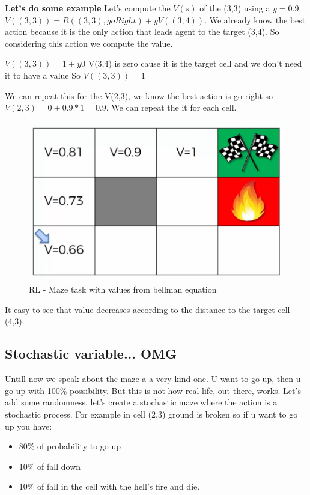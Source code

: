 \textbf{Let's do some example}
Let's compute the $V(s)$ of the (3,3) using a $y = 0.9$.
$V((3,3)) = R((3,3), goRight) + yV((3,4))$. We already know the best action because it is the only action that leads agent to the target (3,4). So considering this action we compute the value.

$V((3,3)) = 1 + y0$ V(3,4) is zero cause it is the target cell and we don't need it to have a value
So $V((3,3)) = 1$

We can repeat this for the V(2,3), we know the best action is go right so $V(2,3) = 0 + 0.9 * 1 = 0.9$. We can repeat the it for each cell.

\begin{figure}
    \centering
    \includegraphics[scale=0.35]{img/rl-maze-be.png}
    \caption{RL - Maze task with values from bellman equation}
    \label{img:RL-Maze}
\end{figure}

It easy to see that value decreases according to the distance to the target cell (4,3).

\subsection{Stochastic variable... OMG}
Untill now we speak about the maze a a very kind one. U want to go up, then u go up with 100\% possibility. But this is not how real life, out there, works. Let's add some randomness, let's create a stochastic maze where the action is a stochastic process. For example in cell (2,3) ground is broken so if u want to go up you have: 
\begin{itemize}
\item 80\% of probability to go up
\item 10\% of fall down
\item 10\% of fall in the cell with the hell's fire and die.
\end{itemize}

